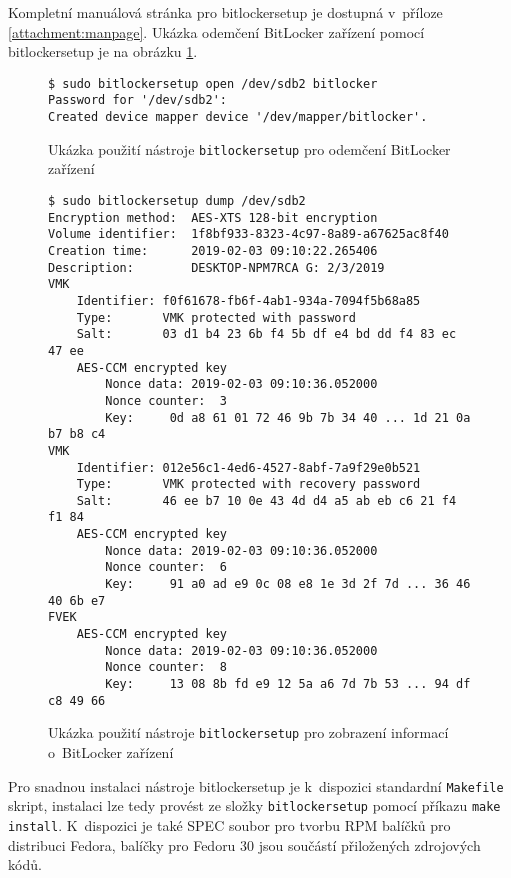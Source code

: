 Kompletní manuálová stránka pro bitlockersetup je dostupná v~příloze \ref{attachment:manpage}. Ukázka odemčení BitLocker zařízení pomocí bitlockersetup je na obrázku \ref{fig:bitlockersetup-open}.

\begin{figure}[h]
		\centering
		\captionsetup{width=0.65\linewidth}
\begin{lstlisting}[frame=none, basicstyle=\ttfamily\small, columns=fullflexible, keepspaces=true]
$ sudo bitlockersetup open /dev/sdb2 bitlocker
Password for '/dev/sdb2': 
Created device mapper device '/dev/mapper/bitlocker'.

\end{lstlisting}
		\caption{Ukázka použití nástroje \texttt{bitlockersetup} pro odemčení BitLocker zařízení}
		\label{fig:bitlockersetup-open}
\end{figure}

\begin{figure}[h]
		\centering
		\captionsetup{width=0.65\linewidth}
\begin{lstlisting}[frame=none, basicstyle=\ttfamily\small, columns=fullflexible, keepspaces=true]
$ sudo bitlockersetup dump /dev/sdb2
Encryption method:	AES-XTS 128-bit encryption
Volume identifier:	1f8bf933-8323-4c97-8a89-a67625ac8f40
Creation time:		2019-02-03 09:10:22.265406
Description:		DESKTOP-NPM7RCA G: 2/3/2019
VMK
	Identifier:	f0f61678-fb6f-4ab1-934a-7094f5b68a85
	Type:		VMK protected with password
	Salt:		03 d1 b4 23 6b f4 5b df e4 bd dd f4 83 ec 47 ee
	AES-CCM encrypted key
		Nonce data:	2019-02-03 09:10:36.052000
		Nonce counter:	3
		Key:	 0d a8 61 01 72 46 9b 7b 34 40 ... 1d 21 0a b7 b8 c4
VMK
	Identifier:	012e56c1-4ed6-4527-8abf-7a9f29e0b521
	Type:		VMK protected with recovery password
	Salt:		46 ee b7 10 0e 43 4d d4 a5 ab eb c6 21 f4 f1 84
	AES-CCM encrypted key
		Nonce data:	2019-02-03 09:10:36.052000
		Nonce counter:	6
		Key:	 91 a0 ad e9 0c 08 e8 1e 3d 2f 7d ... 36 46 40 6b e7
FVEK
	AES-CCM encrypted key
		Nonce data:	2019-02-03 09:10:36.052000
		Nonce counter:	8
		Key:	 13 08 8b fd e9 12 5a a6 7d 7b 53 ... 94 df c8 49 66

\end{lstlisting}
		\caption{Ukázka použití nástroje \texttt{bitlockersetup} pro zobrazení informací o~BitLocker zařízení}
		\label{fig:bitlockersetup-dump}
\end{figure}


Pro snadnou instalaci nástroje bitlockersetup je k~dispozici standardní \texttt{Makefile} skript, instalaci lze tedy provést ze složky \texttt{bitlockersetup} pomocí příkazu \texttt{make install}. K~dispozici je také SPEC soubor pro tvorbu RPM balíčků pro distribuci Fedora, balíčky pro Fedoru 30 jsou součástí přiložených zdrojových kódů.

